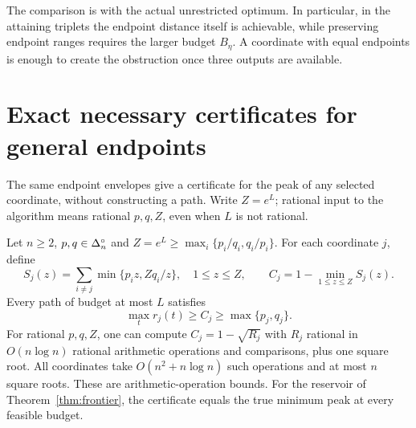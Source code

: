 The comparison is with the actual unrestricted optimum. In particular, in the attaining triplets the endpoint distance itself is achievable, while preserving endpoint ranges requires the larger budget $B_\eta$. A coordinate with equal endpoints is enough to create the obstruction once three outputs are available.

\section{Exact necessary certificates for general endpoints}
The same endpoint envelopes give a certificate for the peak of any selected coordinate, without constructing a path. Write $Z=e^L$; rational input to the algorithm means rational $p,q,Z$, even when $L$ is not rational.

\begin{theorem}\label{thm:sweep}
Let $n\ge2$, $p,q\in\Delta_n^\circ$ and
$Z=e^L\ge\max_i\{p_i/q_i,q_i/p_i\}$. For each coordinate $j$, define
\begin{equation}\label{eq:cert}
 S_j(z)=\sum_{i\ne j}\min\{p_i z,Zq_i/z\},\quad 1\le z\le Z,
 \qquad C_j=1-\min_{1\le z\le Z}S_j(z).
\end{equation}
Every path of budget at most $L$ satisfies
\[
 \max_t r_j(t)\ge C_j\ge\max\{p_j,q_j\}.
\]
For rational $p,q,Z$, one can compute $C_j=1-\sqrt{R_j}$ with $R_j$ rational in $O(n\log n)$ rational arithmetic operations and comparisons, plus one square root. All coordinates take $O(n^2+n\log n)$ such operations and at most $n$ square roots. These are arithmetic-operation bounds. For the reservoir of Theorem~\ref{thm:frontier}, the certificate equals the true minimum peak at every feasible budget.
\end{theorem}
